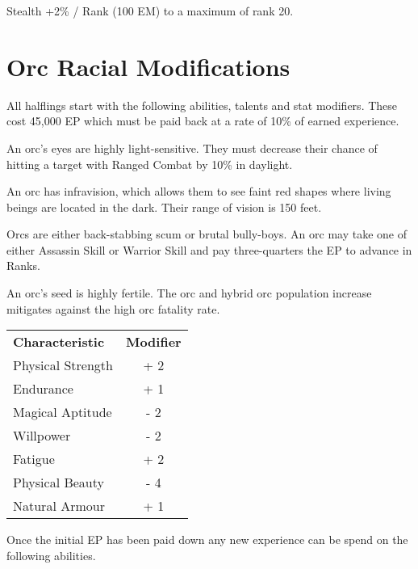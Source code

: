 \documentclass[a4paper]{article}
\begin{document}
\begin{multicols*}{3}
\begin{Enumerate}
\item
Stealth +2\% / Rank (100 EM) to a maximum of rank 20.
\end{Enumerate}



\section{Orc Racial Modifications}

All halflings start with the following abilities, talents and stat
modifiers.  These cost 45,000 EP which must be paid back at a
rate of 10\% of earned experience.
  
\begin{Enumerate}
\item
An orc's eyes are highly light-sensitive. They must decrease their
chance of hitting a target with Ranged Combat by 10\% in daylight.

\item
An orc has infravision, which allows them to see faint red shapes
where living beings are located in the dark. Their range of vision is
150 feet.

\item
Orcs are either back-stabbing scum or brutal bully-boys. An orc may
take one of either Assassin Skill or Warrior Skill and pay
three-quarters the EP to advance in Ranks.

\item
An orc's seed is highly fertile. The orc and hybrid orc population
increase mitigates against the high orc fatality rate.
\end{Enumerate}

\begin{tabularx}{\linewidth}{Xc}
\textbf{Characteristic} & \textbf{Modifier} \\
Physical Strength	& + 2 \\
Endurance		& + 1 \\
Magical Aptitude	& - 2 \\
Willpower		& - 2 \\
Fatigue			& + 2 \\
Physical Beauty		& - 4 \\
Natural Armour		& + 1 \\
\end{tabularx}

Once the initial EP has been paid down any new experience can be spend
on the following abilities.


\end{multicols*}
\end{document}
